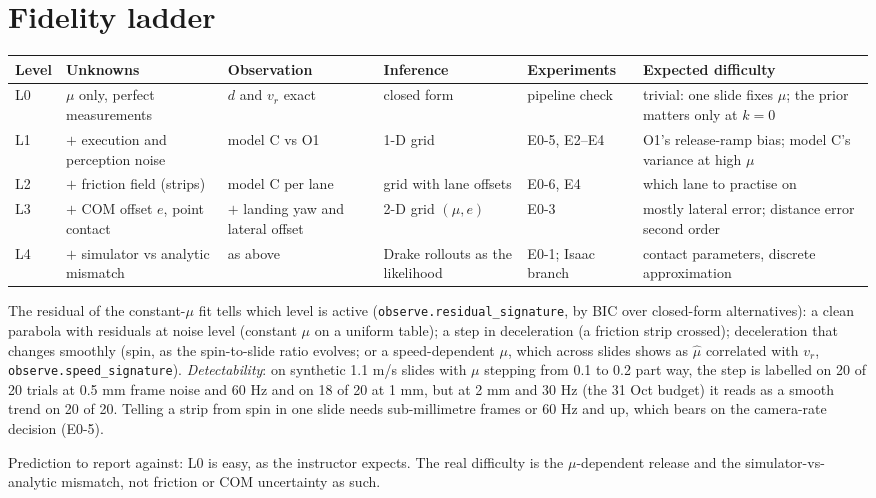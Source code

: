 \documentclass[10pt]{article}
\newcommand{\code}[1]{\texttt{#1}}
\begin{document}
\section{Fidelity ladder}
\label{sec:ladder}
\begin{center}\small
\begin{tabular}{@{}lp{3.0cm}p{2.9cm}p{2.6cm}p{2.2cm}p{4.0cm}@{}}
\toprule
Level & Unknowns & Observation & Inference & Experiments & Expected difficulty\\
\midrule
L0 & $\mu$ only, perfect measurements & $d$ and $v_r$ exact & closed form & pipeline check & trivial: one slide fixes $\mu$; the prior matters only at $k=0$\\
L1 & $+$ execution and perception noise & model C vs O1 & 1-D grid & E0-5, E2--E4 & O1's release-ramp bias; model C's variance at high $\mu$\\
L2 & $+$ friction field (strips) & model C per lane & grid with lane offsets & E0-6, E4 & which lane to practise on\\
L3 & $+$ COM offset $e$, point contact & $+$ landing yaw and lateral offset & 2-D grid $(\mu,e)$ & E0-3 & mostly lateral error; distance error second order\\
L4 & $+$ simulator vs analytic mismatch & as above & Drake rollouts as the likelihood & E0-1; Isaac branch & contact parameters, discrete approximation\\
\bottomrule
\end{tabular}
\end{center}
The residual of the constant-$\mu$ fit tells which level is active (\code{observe.residual\_signature}, by BIC over
closed-form alternatives): a clean parabola with residuals at noise level (constant $\mu$ on a uniform table); a
step in deceleration (a friction strip crossed); deceleration that changes smoothly (spin, as the spin-to-slide
ratio evolves; or a speed-dependent $\mu$, which across slides shows as $\hat\mu$ correlated with $v_r$,
\code{observe.speed\_signature}).  \emph{Detectability}: on synthetic 1.1 m/s slides with $\mu$ stepping from 0.1
to 0.2 part way, the step is labelled on 20 of 20 trials at 0.5 mm frame noise and 60 Hz and on 18 of 20 at 1 mm,
but at 2 mm and 30 Hz (the 31 Oct budget) it reads as a smooth trend on 20 of 20.  Telling a strip from spin in one slide
needs sub-millimetre frames or 60 Hz and up, which bears on the camera-rate decision (E0-5).

Prediction to report against: L0 is easy, as the instructor expects.  The real difficulty is the $\mu$-dependent
release and the simulator-vs-analytic mismatch, not friction or COM uncertainty as such.
\end{document}
